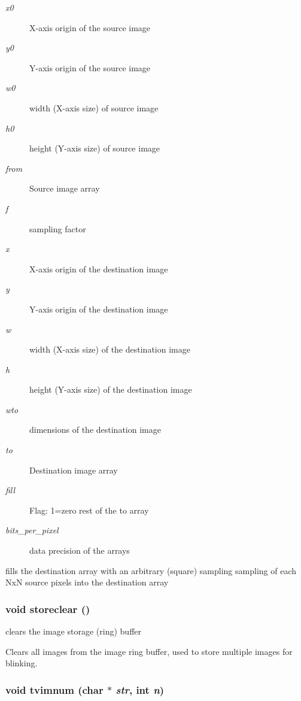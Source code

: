 \begin{Desc}
\item[Parameters:]
\begin{description}
\item[{\em x0}]X-axis origin of the source image \item[{\em y0}]Y-axis origin of the source image \item[{\em w0}]width (X-axis size) of source image \item[{\em h0}]height (Y-axis size) of source image \item[{\em from}]Source image array \item[{\em f}]sampling factor \item[{\em x}]X-axis origin of the destination image \item[{\em y}]Y-axis origin of the destination image \item[{\em w}]width (X-axis size) of the destination image \item[{\em h}]height (Y-axis size) of the destination image \item[{\em wto}]dimensions of the destination image \item[{\em to}]Destination image array \item[{\em fill}]Flag: 1=zero rest of the to array \item[{\em bits\_\-per\_\-pixel}]data precision of the arrays\end{description}
\end{Desc}
fills the destination array with an arbitrary (square) sampling sampling of each Nx\-N source pixels into the destination array 
\subsubsection{\setlength{\rightskip}{0pt plus 5cm}void storeclear ()}\label{xtv_8h_a76}


clears the image storage (ring) buffer 

Clears all images from the image ring buffer, used to store multiple images for blinking. 
\subsubsection{\setlength{\rightskip}{0pt plus 5cm}void tvimnum (char $\ast$ {\em str}, int {\em n})}\label{xtv_8h_a90}


